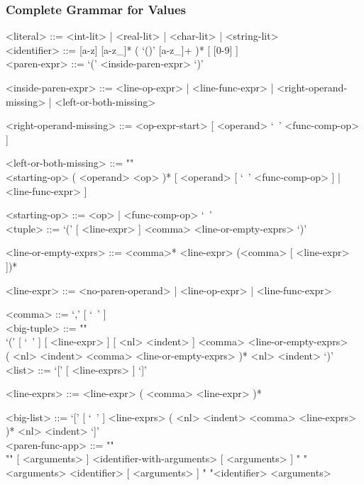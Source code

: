 \documentclass{article}
\begin{document}
\subsubsection{Complete Grammar for Values}
\begin{grammar}

<literal> ::= <int-lit> | <real-lit> | <char-lit> | <string-lit>
\\

<identifier> ::= [a-z] [a-z_]* ( `()' [a-z_]+ )* [ [0-9] ]
\\

<paren-expr> ::= `(' <inside-paren-expr> `)'  

<inside-paren-expr> ::= 
<line-op-expr> | <line-func-expr> | <right-operand-missing> | <left-or-both-missing>

<right-operand-missing> ::= <op-expr-start> [ <operand> `\ ' <func-comp-op> ]

<left-or-both-missing> ::= ""\\
<starting-op> ( <operand> <op> )*
[ <operand> [ `\ ' <func-comp-op> ] | <line-func-expr> ]

<starting-op> ::= <op> | <func-comp-op> `\ '
\\

<tuple> ::= `(' [ <line-expr> ] <comma> <line-or-empty-exprs> `)'

<line-or-empty-exprs> ::=
<comma>* <line-expr> (<comma> [ <line-expr> ])*

<line-expr> ::= <no-paren-operand> | <line-op-expr> | <line-func-expr>

<comma> ::= `,' [ `\ ' ]
\\

<big-tuple> ::= ""\\
`(' [ `\ ' ]  [ <line-expr> ] [ <nl> <indent> ] <comma> <line-or-empty-exprs> \\
( <nl> <indent> <comma> <line-or-empty-exprs> )* 
<nl> <indent> `)'
\\

<list> ::= `[' [ <line-exprs> ] `]'

<line-exprs> ::= <line-expr> ( <comma> <line-expr> )*

<big-list> ::= 
`[' [ `\ ' ] <line-exprs> ( <nl> <indent> <comma> <line-exprs> )* <nl> <indent> `]'
\\

<paren-func-app> ::= ""\\""
[ <arguments> ] <identifier-with-arguments> [ <arguments> ]
\alt " "<arguments> <identifier> [ <arguments> ]
\alt " "<identifier> <arguments>


\end{grammar}
\end{document}
